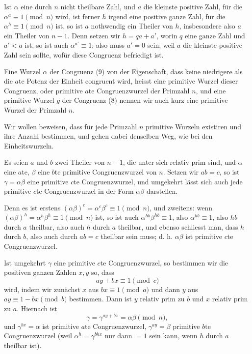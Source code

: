 \documentclass[11pt]{article}
\begin{document}
Ist $\alpha$ eine durch $n$ nicht theilbare Zahl, und $a$ die kleinste positive Zahl, für die $\alpha^a\equiv1\pmod n$ wird, ist ferner $h$ irgend eine positive ganze Zahl, für die $\alpha^h\equiv1\pmod n$ ist, so ist $a$ nothwendig ein Theiler von $h$, insbesondere also $a$ ein Theiler von $n-1$. Denn setzen wir $h=qa+a'$, worin $q$ eine ganze Zahl und $a'<a$ ist, so ist auch $\alpha^{a'}\equiv1$; also muss $a'=0$ sein, weil $a$ die kleinste positive Zahl sein sollte, wofür diese Congruenz befriedigt ist.

Eine Wurzel $\alpha$ der Congruenz (9) von der Eigenschaft, dass keine niedrigere als die $a$te Potenz der Einheit congruent wird, heisst eine primitive Wurzel dieser Congruenz, oder primitive $a$te Congruenzwurzel der Primzahl $n$, und eine primitive Wurzel $g$ der Congruenz (8) nennen wir auch kurz eine primitive Wurzel der Primzahl $n$.

Wir wollen beweisen, dass für jede Primzahl $n$ primitive Wurzeln existiren und ihre Anzahl bestimmen, und gehen dabei denselben Weg, wie bei den Einheitswurzeln.

Es seien $a$ und $b$ zwei Theiler von $n-1$, die unter sich relativ prim sind, und $\alpha$ eine $a$te, $\beta$ eine $b$te primitive Congruenzwurzel von $n$. Setzen wir $ab=c$, so ist $\gamma=\alpha\beta$ eine primitive $c$te Congruenzwurzel, und umgekehrt lässt sich auch jede primitive $c$te Congruenzwurzel in der Form $\alpha\beta$ darstellen.

Denn es ist erstens $(\alpha\beta)^c=\alpha^c\beta^c\equiv1\pmod n$, und zweitens: wenn $(\alpha\beta)^h=\alpha^h\beta^h\equiv1\pmod n$ ist, so ist auch $\alpha^{hb}\beta^{hb}\equiv1$, also $\alpha^{hb}\equiv1$, also $hb$ durch $a$ theilbar, also auch $h$ durch $a$ theilbar, und ebenso schliesst man, dass $h$ durch $b$, also auch durch $ab=c$ theilbar sein muss; d. h. $\alpha\beta$ ist primitive $c$te Congruenzwurzel.

Ist umgekehrt $\gamma$ eine primitive $c$te Congruenzwurzel, so bestimmen wir die positiven ganzen Zahlen $x,y$ so, dass
\[
\tag{10}       ay+bx\equiv1\pmod c
\]
wird, indem wir zunächst $x$ aus $bx\equiv1\pmod a$ und dann $y$ aus $ay\equiv1-bx\pmod b$ bestimmen. Dann ist $y$ relativ prim zu $b$ und $x$ relativ prim zu $a$. Hiernach ist
\[
        \gamma=\gamma^{ay+bx}=\alpha\beta\pmod n,
\]
und $\gamma^{bx}=\alpha$ ist primitive $a$te Congruenzwurzel, $\gamma^{ay}=\beta$ primitive $b$te Congruenzwurzel (weil $\alpha^h=\gamma^{bhx}$ nur dann $=1$ sein kann, wenn $h$ durch $a$ theilbar ist).
\end{document}
